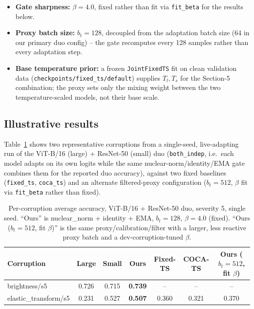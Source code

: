 \begin{itemize}
    change the gate needs to react to.
    \item \textbf{Gate sharpness:} $\beta = 4.0$, fixed rather than fit via
    \texttt{fit\_beta} for the results below.
    \item \textbf{Proxy batch size:} $b_t = 128$, decoupled from the
    adaptation batch size (64 in our primary duo config) -- the gate
    recomputes every 128 samples rather than every adaptation step.
    \item \textbf{Base temperature prior:} a frozen \texttt{JointFixedTS}
    fit on clean validation data (\texttt{checkpoints/fixed\_ts/default})
    supplies $T_l, T_s$ for the Section-5 combination; the proxy sets only
    the mixing weight between the two temperature-scaled models, not their
    base scale.
\end{itemize}

\subsection{Illustrative results}
\label{sec:experiments:results}

Table~\ref{tab:duo-results} shows two representative corruptions from a
single-seed, live-adapting run of the ViT-B/16 (large) + ResNet-50 (small)
duo (\texttt{both\_indep}, i.e.\ each model adapts on its own logits while
the same nuclear-norm/identity/EMA gate combines them for the reported duo
accuracy), against two fixed baselines (\texttt{fixed\_ts}, \texttt{coca\_ts})
and an alternate filtered-proxy configuration
($b_t = 512$, $\beta$ fit via \texttt{fit\_beta} rather than fixed).

\begin{table}[h]
    \centering
    \caption{Per-corruption average accuracy, ViT-B/16 + ResNet-50 duo,
    severity 5, single seed. ``Ours'' is nuclear\_norm + identity + EMA,
    $b_t=128$, $\beta=4.0$ (fixed). ``Ours ($b_t{=}512$, fit $\beta$)'' is
    the same proxy/calibration/filter with a larger, less reactive proxy
    batch and a dev-corruption-tuned $\beta$.}
    \label{tab:duo-results}
    \begin{tabular}{lcccccc}
        \toprule
        Corruption & Large & Small & Ours & Fixed-TS & COCA-TS & Ours ($b_t{=}512$, fit $\beta$) \\
        \midrule
        brightness/s5        & 0.726 & 0.715 & \textbf{0.739} & --    & --    & -- \\
        elastic\_transform/s5 & 0.231 & 0.527 & \textbf{0.507} & 0.360 & 0.321 & 0.370 \\
        \bottomrule
    \end{tabular}
\end{table}

